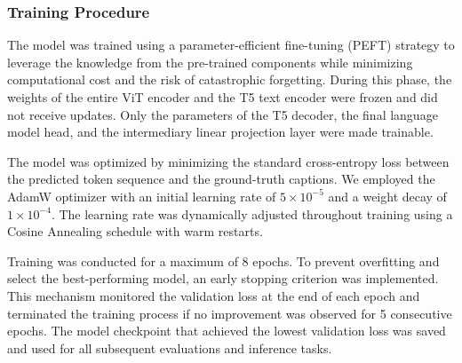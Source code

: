 \subsubsection{Training Procedure}
The model was trained using a parameter-efficient fine-tuning (PEFT) strategy to leverage the knowledge from the pre-trained components while minimizing computational cost and the risk of catastrophic forgetting. During this phase, the weights of the entire ViT encoder and the T5 text encoder were frozen and did not receive updates. Only the parameters of the T5 decoder, the final language model head, and the intermediary linear projection layer were made trainable.

The model was optimized by minimizing the standard cross-entropy loss between the predicted token sequence and the ground-truth captions. We employed the AdamW optimizer with an initial learning rate of $5 \times 10^{-5}$ and a weight decay of $1 \times 10^{-4}$. The learning rate was dynamically adjusted throughout training using a Cosine Annealing schedule with warm restarts.

Training was conducted for a maximum of 8 epochs. To prevent overfitting and select the best-performing model, an early stopping criterion was implemented. This mechanism monitored the validation loss at the end of each epoch and terminated the training process if no improvement was observed for 5 consecutive epochs. The model checkpoint that achieved the lowest validation loss was saved and used for all subsequent evaluations and inference tasks.

